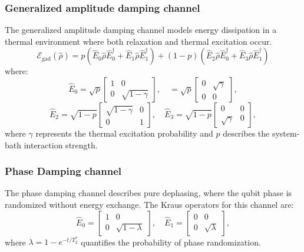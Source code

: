 \subsubsection{Generalized amplitude damping channel}
The generalized amplitude damping channel models energy dissipation in a thermal environment where both relaxation and thermal excitation occur. 
\begin{equation}\label{eq:GAD_channel}
    \mathcal{E}_{\text{gad}}(\hat{\rho}) = p \left( \hat{E}_0 \hat{\rho} \hat{E}_0^{\dagger} + \hat{E}_1 \hat{\rho} \hat{E}_1^{\dagger} \right) + (1 - p) \left( \hat{E}_2 \hat{\rho} \hat{E}_0^{\dagger} + \hat{E}_3 \hat{\rho} \hat{E}_1^{\dagger} \right)
\end{equation}
where:
\begin{equation}
    \hat{E}_0 = \sqrt{p} \begin{bmatrix} 1 & 0 \\ 0 & \sqrt{1 - \gamma} \end{bmatrix}, \quad
     = \sqrt{p} \begin{bmatrix} 0 & \sqrt{\gamma} \\ 0 & 0 \end{bmatrix},
\end{equation}
\begin{equation}
    \hat{E}_2 = \sqrt{1 - p} \begin{bmatrix} \sqrt{1 - \gamma} & 0 \\ 0 & 1 \end{bmatrix}, \quad
    \hat{E}_3 = \sqrt{1 - p} \begin{bmatrix} 0 & 0 \\ \sqrt{\gamma} & 0 \end{bmatrix},
\end{equation}
where $\gamma$ represents the thermal excitation probability and $p$ describes the system-bath interaction strength.

\subsubsection{Phase Damping channel}
The phase damping channel describes pure dephasing, where the qubit phase is randomized without energy exchange. The Kraus operators for this channel are:
\begin{equation}
    \hat{E}_0 = \begin{bmatrix} 1 & 0 \\ 0 & \sqrt{1 - \lambda} \end{bmatrix}, \quad
    \hat{E}_1 = \begin{bmatrix} 0 & 0 \\ 0 & \sqrt{\lambda} \end{bmatrix},
\end{equation}
where $\lambda = 1 - e^{-t/T_2^*}$ quantifies the probability of phase randomization.

